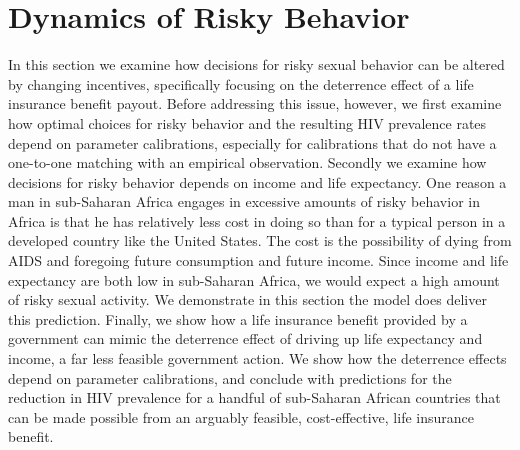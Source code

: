 \documentclass[12pt]{article}
\begin{document}
\section{Dynamics of Risky Behavior}
In this section we examine how decisions for risky sexual behavior can be altered by changing incentives, specifically focusing on the deterrence effect of a life insurance benefit payout.  Before addressing this issue, however, we first examine how optimal choices for risky behavior and the resulting HIV prevalence rates depend on parameter calibrations, especially for calibrations that do not have a one-to-one matching with an empirical observation.  Secondly we examine how decisions for risky behavior depends on income and life expectancy.  One reason a man in sub-Saharan Africa engages in excessive amounts of risky behavior in Africa is that he has relatively less cost in doing so than for a typical person in a developed country like the United States.  The cost is the possibility of dying from AIDS and foregoing future consumption and future income.  Since income and life expectancy are both low in sub-Saharan Africa, we would expect a high amount of risky sexual activity.  We demonstrate in this section the model does deliver this prediction.  Finally, we show how a life insurance benefit provided by a government can mimic the deterrence effect of driving up life expectancy and income, a far less feasible government action.  We show how the deterrence effects depend on parameter calibrations, and conclude with predictions for the reduction in HIV prevalence for a handful of sub-Saharan African countries that can be made possible from an arguably feasible, cost-effective, life insurance benefit.
\end{document}

